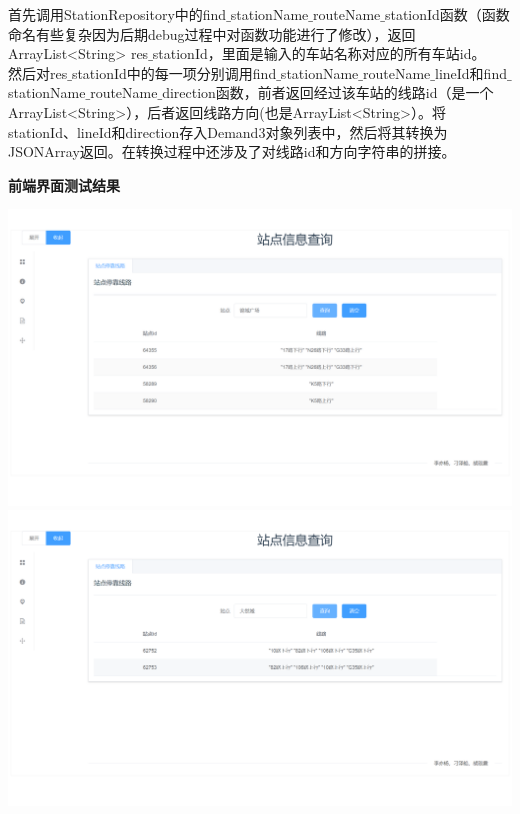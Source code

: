 \documentclass[11pt,a4paper]{article}
\begin{document}
首先调用StationRepository中的find$\_$stationName$\_$routeName$\_$stationId函数（函数命名有些复杂因为后期debug过程中对函数功能进行了修改），返回ArrayList<String> res$\_$stationId，里面是输入的车站名称对应的所有车站id。\\
然后对res$\_$stationId中的每一项分别调用find$\_$stationName$\_$routeName$\_$lineId和find$\_$stationName$\_$routeName$\_$direction函数，前者返回经过该车站的线路id（是一个ArrayList<String>），后者返回线路方向(也是ArrayList<String>）。将stationId、lineId和direction存入Demand3对象列表中，然后将其转换为JSONArray返回。在转换过程中还涉及了对线路id和方向字符串的拼接。

\textbf{前端界面测试结果} \\
\begin{center}
\centering
\includegraphics[scale=0.3]{./assets/demand3_1.png} \\ 
\includegraphics[scale=0.3]{./assets/demand3_2.png} 
\end{center}
\end{document}
